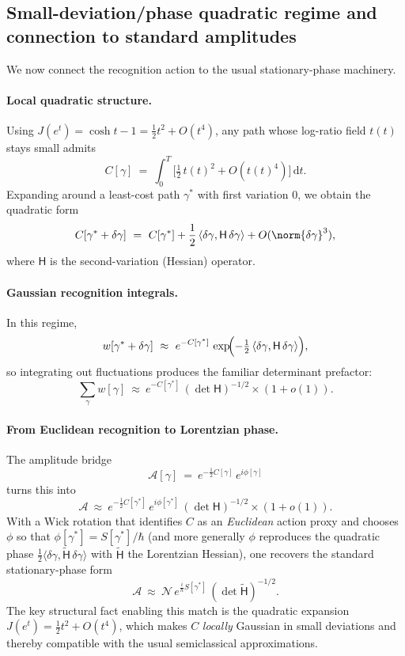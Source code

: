 \documentclass[12pt,a4paper]{article}
\theoremstyle{definition}
\theoremstyle{remark}
\begin{document}
\subsection{Small-deviation/phase quadratic regime and connection to standard amplitudes}
\label{sec:small-dev}

We now connect the recognition action to the usual stationary-phase machinery.

\paragraph{Local quadratic structure.} Using $J(e^t)=\cosh t-1 = \tfrac12 t^2 + O(t^4)$, any path whose log-ratio field $t(t)$ stays small admits
\[
  C[\gamma]\ =\ \int_0^T \bigl[\tfrac12\, t(t)^2 + O(t(t)^4)\bigr]\,\mathrm{d}t.
\]
Expanding around a least-cost path \(\gamma^\ast\) with first variation $0$, we obtain the quadratic form
\[
  C[\gamma^\ast+\delta\gamma]\ =\ C[\gamma^\ast] + \frac12\,\langle \delta\gamma,\mathsf{H}\,\delta\gamma\rangle + O(\norm{\delta\gamma}^3),
\]
where \(\mathsf{H}\) is the second-variation (Hessian) operator.

\paragraph{Gaussian recognition integrals.} In this regime,
\[
  w[\gamma^\ast+\delta\gamma]\ \approx\ e^{-C[\gamma^\ast]}\, \exp\!\Bigl(-\tfrac12\,\langle \delta\gamma,\mathsf{H}\,\delta\gamma\rangle\Bigr),
\]
so integrating out fluctuations produces the familiar determinant prefactor:
\[
  \sum_{\gamma}\!w[\gamma]\ \approx\ e^{-C[\gamma^\ast]}\,(\det \mathsf{H})^{-1/2}\times(1+o(1)).
\]

\paragraph{From Euclidean recognition to Lorentzian phase.} The amplitude bridge
\[
  \mathcal{A}[\gamma]\ =\ e^{-\tfrac12 C[\gamma]}\,e^{i\phi[\gamma]}
\]
turns this into
\[
  \mathcal{A}\ \approx\ e^{-\tfrac12 C[\gamma^\ast]}\,e^{i\phi[\gamma^\ast]}\,(\det \mathsf{H})^{-1/2}\times(1+o(1)).
\]
With a Wick rotation that identifies $C$ as an \emph{Euclidean} action proxy and chooses \(\phi\) so that \(\phi[\gamma^\ast]=S[\gamma^\ast]/\hbar\) (and more generally \(\phi\) reproduces the quadratic phase \(\tfrac12\langle \delta\gamma, \widetilde{\mathsf{H}}\,\delta\gamma\rangle\) with \(\widetilde{\mathsf{H}}\) the Lorentzian Hessian), one recovers the standard stationary-phase form
\[
  \mathcal{A}\ \approx\ \mathcal{N}\,e^{\tfrac{i}{\hbar}S[\gamma^\ast]}\,(\det \widetilde{\mathsf{H}})^{-1/2}.
\]
The key structural fact enabling this match is the quadratic expansion $J(e^t)=\tfrac12 t^2+O(t^4)$, which makes $C$ \emph{locally} Gaussian in small deviations and thereby compatible with the usual semiclassical approximations.
\end{document}

